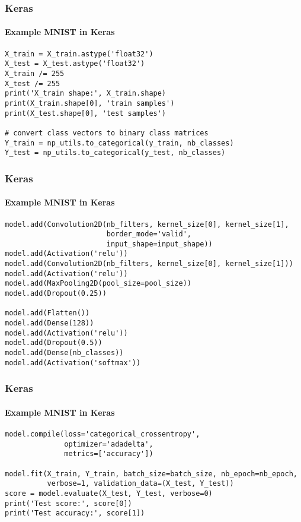 \documentclass[9pt]{beamer}
\begin{document}
\begin{frame}[fragile]
\frametitle{Keras}
\framesubtitle{Example MNIST in Keras}
\lstset{language=Python, breaklines=true, basicstyle=\footnotesize}   
\begin{lstlisting}[frame=single] 
X_train = X_train.astype('float32')
X_test = X_test.astype('float32')
X_train /= 255
X_test /= 255
print('X_train shape:', X_train.shape)
print(X_train.shape[0], 'train samples')
print(X_test.shape[0], 'test samples')

# convert class vectors to binary class matrices
Y_train = np_utils.to_categorical(y_train, nb_classes)
Y_test = np_utils.to_categorical(y_test, nb_classes)
\end{lstlisting}
\end{frame}

\begin{frame}[fragile]
\frametitle{Keras}
\framesubtitle{Example MNIST in Keras}
\lstset{language=Python, breaklines=true, basicstyle=\footnotesize}   
\begin{lstlisting}[frame=single] 
model.add(Convolution2D(nb_filters, kernel_size[0], kernel_size[1],
                        border_mode='valid',
                        input_shape=input_shape))
model.add(Activation('relu'))
model.add(Convolution2D(nb_filters, kernel_size[0], kernel_size[1]))
model.add(Activation('relu'))
model.add(MaxPooling2D(pool_size=pool_size))
model.add(Dropout(0.25))

model.add(Flatten())
model.add(Dense(128))
model.add(Activation('relu'))
model.add(Dropout(0.5))
model.add(Dense(nb_classes))
model.add(Activation('softmax'))
\end{lstlisting}
\end{frame}

\begin{frame}[fragile]
\frametitle{Keras}
\framesubtitle{Example MNIST in Keras}
\lstset{language=Python, breaklines=true, basicstyle=\footnotesize}   
\begin{lstlisting}[frame=single] 
model.compile(loss='categorical_crossentropy',
              optimizer='adadelta',
              metrics=['accuracy'])

model.fit(X_train, Y_train, batch_size=batch_size, nb_epoch=nb_epoch,
          verbose=1, validation_data=(X_test, Y_test))
score = model.evaluate(X_test, Y_test, verbose=0)
print('Test score:', score[0])
print('Test accuracy:', score[1])
\end{lstlisting}
\end{frame}
\end{document}
